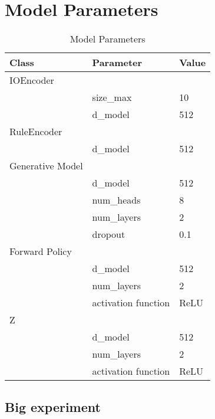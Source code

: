 \clearpage
\section{Model Parameters}
\begin{table}[h!]
    \centering
    \begin{tabular}{|l|l|l|}
    \hline
    \textbf{Class} & \textbf{Parameter} & \textbf{Value} \\
    \hline
    IOEncoder &  &  \\
     & size\_max & 10 \\
     & d\_model & 512 \\
    \hline
    RuleEncoder & & \\
     & d\_model & 512 \\
    \hline
    Generative Model &  & \\
     & d\_model & 512 \\
     & num\_heads & 8 \\
     & num\_layers & 2 \\
     & dropout & 0.1 \\
    \hline
    Forward Policy & & \\
    & d\_model & 512 \\
    & num\_layers & 2 \\
    & activation function & ReLU \\
    \hline
    Z & & \\
    & d\_model & 512 \\
    & num\_layers & 2 \\
    & activation function & ReLU \\
    \hline
    \end{tabular}
    \caption{Model Parameters}
    \label{table:params}
    \end{table}


    \subsection{Big experiment}

